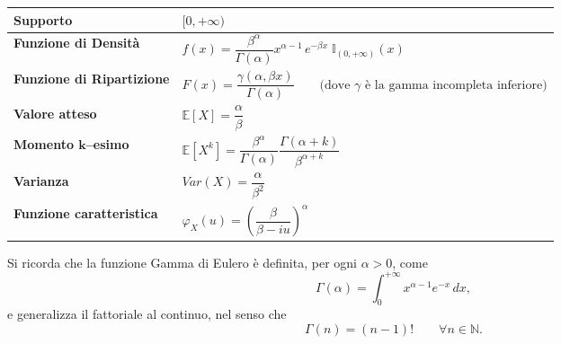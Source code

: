 \bigskip
\begin{table}[H]
\centering
\renewcommand{\arraystretch}{2}
\begin{tabular}{@{}ll@{}}
\toprule
\textbf{Supporto} 
& $[0,+\infty)$ \\

\midrule

\textbf{Funzione di Densità} 
& $
f(x)=
\dfrac{\beta^\alpha}{\Gamma(\alpha)}
x^{\alpha-1}\,e^{-\beta x}\;\mathbb{I}_{(0, +\infty)}(x)
$ \\

\midrule

\textbf{Funzione di Ripartizione}
& $
F(x)=
\dfrac{\gamma(\alpha,\beta x)}{\Gamma(\alpha)}
\qquad
\bigl(\text{dove }\gamma \text{ è la gamma incompleta inferiore}\bigr)
$ \\

\midrule

\textbf{Valore atteso} 
& $\mathbb{E}[X]=\dfrac{\alpha}{\beta}$ \\

\midrule
\textbf{Momento $\boldsymbol{k}$--esimo}
& $\mathbb{E}\left[X^k\right] = \dfrac{\beta^\alpha}{\Gamma (\alpha)} \dfrac{\Gamma(\alpha + k)}{\beta^{\alpha + k}}$ \\

\midrule

\textbf{Varianza}
& $Var(X)=\dfrac{\alpha}{\beta^2}$ \\

\midrule

\textbf{Funzione caratteristica}
& $
\varphi_X(u)=
\left(\dfrac{\beta}{\beta-iu}\right)^{\alpha}
$ \\

\bottomrule
\end{tabular}
\end{table}


\noindent Si ricorda che la funzione Gamma di Eulero è definita, per ogni $\alpha>0$, come
\[
\Gamma(\alpha)=\int_{0}^{+\infty} x^{\alpha-1} e^{-x}\,dx,
\]
e generalizza il fattoriale al continuo, nel senso che
\[
\Gamma(n)=(n-1)! \qquad \forall n\in\mathbb{N}.
\]
